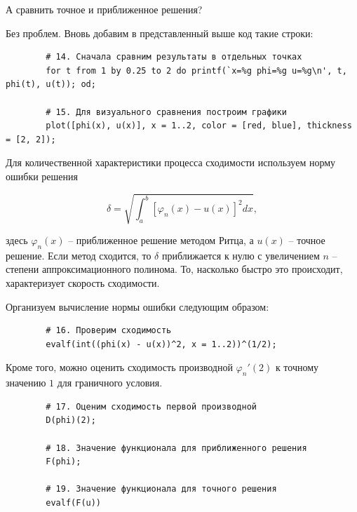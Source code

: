 \newpage
\begin{question}
	А сравнить точное и приближенное решения?
\end{question}

Без проблем. Вновь добавим в представленный выше код такие строки:

\begin{commandline}
	\begin{verbatim}
		# 14. Сначала сравним результаты в отдельных точках 
		for t from 1 by 0.25 to 2 do printf(`x=%g phi=%g u=%g\n', t, phi(t), u(t)); od;

		# 15. Для визуального сравнения построим графики
		plot([phi(x), u(x)], x = 1..2, color = [red, blue], thickness = [2, 2]);
	\end{verbatim}
\end{commandline}

Для количественной характеристики процесса сходимости используем норму ошибки решения

\begin{displaymath}
	\delta = \sqrt{ \int_{a}^{b} \left[ \varphi_{n}(x) - u(x) \right]^{2} dx },
\end{displaymath}

\noindent здесь $\varphi_{n}(x)$ -- приближенное решение методом Ритца, а $u(x)$ -- точное решение. Если метод сходится, то $\delta$ приближается к нулю с увеличением $n$ -- степени аппроксимационного полинома. То, насколько быстро это происходит, характеризует скорость сходимости.

Организуем вычисление нормы ошибки следующим образом:

\begin{commandline}
	\begin{verbatim}
		# 16. Проверим сходимость
		evalf(int((phi(x) - u(x))^2, x = 1..2))^(1/2);
	\end{verbatim}
\end{commandline}

\noindent Кроме того, можно оценить сходимость производной $\varphi_{n}'(2)$ к точному значению $1$ для граничного условия.

\begin{commandline}
	\begin{verbatim}
		# 17. Оценим сходимость первой производной
		D(phi)(2);

		# 18. Значение функционала для приближенного решения
		F(phi);

		# 19. Значение функционала для точного решения
		evalf(F(u))
	\end{verbatim}
\end{commandline}

